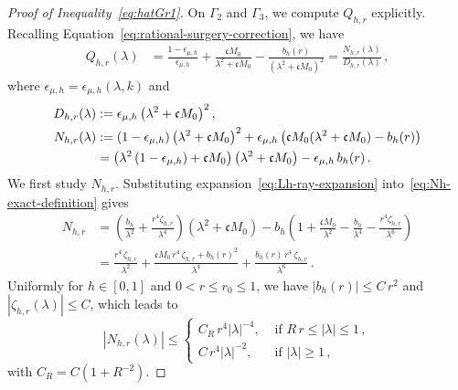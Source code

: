 \documentclass[a4paper,12pt]{amsart} %
\theoremstyle{plain}
\theoremstyle{definition}
\newcommand		{\lt}			{\left}				%
\newcommand		{\rt}			{\right}			%
\renewcommand	{\(}			{\lt(}
\renewcommand	{\)}			{\rt)}
\newcommand		{\n}[1]			{\lt\lvert{#1}\rt\rvert}	%
\newcommand	{\h}			{h}
\newcommand		{\CK}			{\mathfrak{c}}	%
\begin{document}
\begin{proof}[Proof of Inequality~\eqref{eq:hatGr1}]
		On $\Gamma_2$ and $\Gamma_3$, we compute $Q_{h,r}$ explicitly. Recalling Equation~\eqref{eq:rational-surgery-correction}, we have
		\begin{align*}
			Q_{\h,r}(\lambda)
			&=\frac{1-\epsilon_{\mu,\h}}{\epsilon_{\mu,\h}}
			+\frac{\CK M_0}{\lambda^2+\CK M_0}
			-\frac{b_\h(r)}{(\lambda^2+\CK M_0)^2}
			=\frac{N_{\h,r}(\lambda)}{D_{\h,r}(\lambda)} \, ,
		\end{align*}
		where $\epsilon_{\mu,\h} = \epsilon_{\mu,\h}(\lambda,k)$ and
		\begin{align}\label{eq:Dh-exact-definition}
			D_{\h,r}(\lambda) &:= \epsilon_{\mu,\h} \lt(\lambda^2+\CK M_0\rt)^2,
			\\\notag
			N_{\h,r}(\lambda) &:= \lt(1-\epsilon_{\mu,\h}\rt) \lt(\lambda^2+\CK M_0\rt)^2 +\epsilon_{\mu,\h} \lt(\CK M_0(\lambda^2+\CK M_0)-b_\h(r)\rt)
			\\\label{eq:Nh-exact-definition}
			&= \lt(\lambda^2\lt(1-\epsilon_{\mu,\h}\rt)+\CK M_0\rt) \lt(\lambda^2+\CK M_0\rt) - \epsilon_{\mu,\h} \, b_\h(r) \, .
		\end{align}
		We first study $N_{\h,r}$. Substituting expansion~\eqref{eq:Lh-ray-expansion} into~\eqref{eq:Nh-exact-definition} gives
		\begin{align*}
			N_{\h,r}
			&=\left(\frac{b_\h}{\lambda^2}
			+\frac{r^4\zeta_{\h,r}}{\lambda^4}\right)
			(\lambda^2+\CK M_0)
			-b_\h\left(1+\frac{\CK M_0}{\lambda^2}
			-\frac{b_\h}{\lambda^4}
			-\frac{r^4\zeta_{\h,r}}{\lambda^6}\right)
			\\
			&=\frac{r^4\, \zeta_{\h,r}}{\lambda^2}
			+\frac{\CK M_0\, r^4\, \zeta_{\h,r}+b_\h(r)^2}{\lambda^4}
			+\frac{b_\h(r)\, r^4\, \zeta_{\h,r}}{\lambda^6} \, .
		\end{align*}
		Uniformly for $h\in[0,1]$ and $0<r\leq r_0\leq 1$, we have $\n{b_\h(r)}\leq C\, r^2$ and $\n{\zeta_{\h,r}(\lambda)}\leq C$, which leads to
		\begin{equation}\label{eq:Nh-explicit-ray-bound}
			\n{N_{\h,r}(\lambda)} \leq
			\begin{cases}
				C_R\, r^4 \n{\lambda}^{-4}, & \text{ if } R\, r \leq \n{\lambda}\leq 1 \, ,
				\\
				C\, r^4 \n{\lambda}^{-2}, & \text{ if } \n{\lambda} \geq 1 \, ,
			\end{cases}
		\end{equation}
		with $C_R = C \lt(1+R^{-2}\rt)$.


\end{proof}
\end{document}
